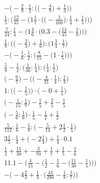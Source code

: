 \documentclass[8pt]{article}
\begin{document}
\begin{align}
-\bigg(-\frac{2}{9} \cdot \frac{1}{2} : \Big(\big(-\frac{4}{9}\big) + \frac{1}{3}\Big)\bigg) \\
\frac{1}{5} : \Bigg(\frac{12}{35} - \bigg(1\frac{1}{7} \cdot \Big(\big(-\frac{3}{160}\big) : \frac{1}{4} + \frac{1}{5}\Big)\bigg)\Bigg) \\
\frac{7}{24} : \frac{1}{4} - \bigg(1\frac{4}{6} \cdot \Big(0.3 - \big(\frac{14}{45} - \frac{1}{9}\big)\Big)\bigg) \\
\frac{1}{8} : \Big(\big(-\frac{2}{3}\big) + \frac{1}{6}\Big) : \Big(1\frac{3}{4} \cdot \frac{1}{7}\Big) \\
-\bigg(-\frac{1}{6} : \frac{1}{2} : \Big(\frac{8}{15} - \big(1 \cdot \frac{1}{5}\big)\Big)\bigg) \\
\frac{5}{9} - \frac{1}{2} : \big(\frac{1}{36} : \frac{1}{4}\big) : \big(\frac{1}{4} : \frac{1}{2}\big) \\
\Big(-\frac{6}{7}\Big) - \Big(\big(-\frac{4}{21} \cdot \frac{1}{4}\big) : \frac{1}{3}\Big) \\
1 : \Big(\big(-\frac{1}{5}\big)\Big) \cdot \Big(-0 + \frac{1}{5}\Big) \\
\big(-\frac{1}{15} : \frac{1}{9}\big) - \frac{1}{5} + \frac{2}{5} - \frac{1}{5} \\
\big(-\frac{5}{6} : \frac{1}{6}\big) \cdot \frac{1}{5} - \frac{1}{2} + \frac{1}{2} \\
\frac{5}{112} : \frac{1}{6} - \frac{1}{8} : \big(-\frac{5}{14} + 2\frac{1}{2} \cdot \frac{1}{5}\big) \\
3\frac{1}{5} \cdot \frac{1}{4} + \big(-2\frac{1}{4}\big) + \frac{1}{4} \cdot 0.1 \\
\frac{1}{2} + \frac{11}{30} + -\frac{3}{70} + \frac{1}{7} + \frac{1}{5} - \frac{1}{6} \\
11.1 - \bigg(\frac{4}{15} - \Big(\frac{1}{2} - \frac{1}{6} - \big(\frac{11}{30} - \frac{1}{5}\big)\Big)\bigg) \\
-\Big(-4\frac{2}{3} + \frac{1}{3} \cdot \big(\frac{43}{280} - \frac{1}{8} : \frac{1}{7}\big)\Big)
\end{align}
\end{document}
